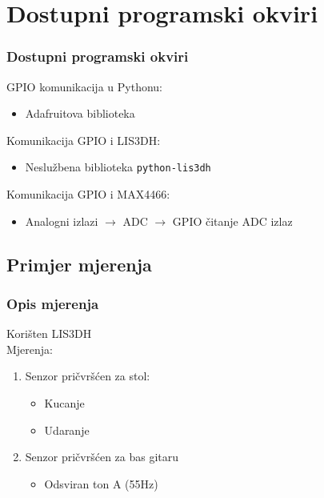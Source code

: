\documentclass[12pt]{beamer}
\begin{document}
\section{Dostupni programski okviri}
\begin{frame}
	\frametitle{Dostupni programski okviri}
	GPIO komunikacija u Pythonu:
	\begin{itemize}
		\item Adafruitova biblioteka
	\end{itemize}

	Komunikacija GPIO i LIS3DH:
	\begin{itemize}
		\item Neslužbena biblioteka \texttt{python-lis3dh}
	\end{itemize}

	Komunikacija GPIO i MAX4466:
	\begin{itemize}
		\item Analogni izlazi $\longrightarrow$ ADC $\longrightarrow$ GPIO čitanje ADC izlaz
	\end{itemize}
\end{frame}

\subsection{Primjer mjerenja}
\begin{frame}
	\frametitle{Opis mjerenja}
	Korišten LIS3DH \\
	Mjerenja:
	\begin{enumerate}
		\item Senzor pričvršćen za stol:
		\begin{itemize}
			\item Kucanje
			\item Udaranje
		\end{itemize}
		\item Senzor pričvršćen za bas gitaru
			\begin{itemize}
			\item Odsviran ton A (55Hz)
		\end{itemize}
	\end{enumerate}
\end{frame}
\end{document}
